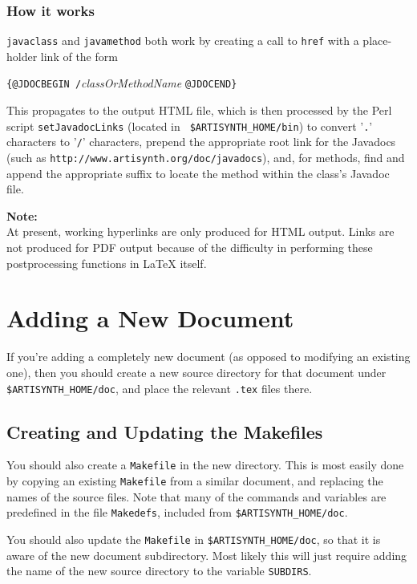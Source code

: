 \documentclass{article}
\begin{document}
\subsubsection{How it works}

{\tt \BKS javaclass} and {\tt \BKS javamethod} both work by creating a call
to {\tt \BKS href} with a place-holder link of the form

 {\tt \{@JDOCBEGIN /}{\it classOrMethodName} {\tt @JDOCEND\}}

This propagates to the output HTML file, which is then processed by
the Perl script {\tt setJavadocLinks} (located in {\tt
\$ARTISYNTH\_HOME/bin}) to convert '{\tt .}' characters to '{\tt /}'
characters, prepend the appropriate root link for the Javadocs (such
as {\tt http://www.\-artisynth.org/doc/javadocs}), and, for methods,
find and append the appropriate suffix to locate the method within the
class's Javadoc file.

\begin{sideblock}
{\bf Note:}\\
At present, working hyperlinks are only produced for HTML output.
Links are not produced for PDF output because of the difficulty
in performing these postprocessing functions in LaTeX itself.
\end{sideblock}

\section{Adding a New Document}

If you're adding a completely new document (as opposed
to modifying an existing one), then you should create a
new source directory for that document under {\tt \$ARTISYNTH\_HOME/doc},
and place the relevant {\tt .tex} files there.

\subsection{Creating and Updating the Makefiles}

You should also create a {\tt Makefile} in the new directory. This is most
easily done by copying an existing {\tt Makefile} from a similar document,
and replacing the names of the source files. 
Note that many of the commands
and variables are predefined in the file {\tt Makedefs}, included from
{\tt \$ARTISYNTH\_HOME/doc}.

You should also update the {\tt Makefile} in {\tt \$ARTISYNTH\_HOME/doc},
so that it is aware of the new document subdirectory. Most
likely this will just require adding the name of the new source
directory to the variable {\tt SUBDIRS}.
\end{document}
